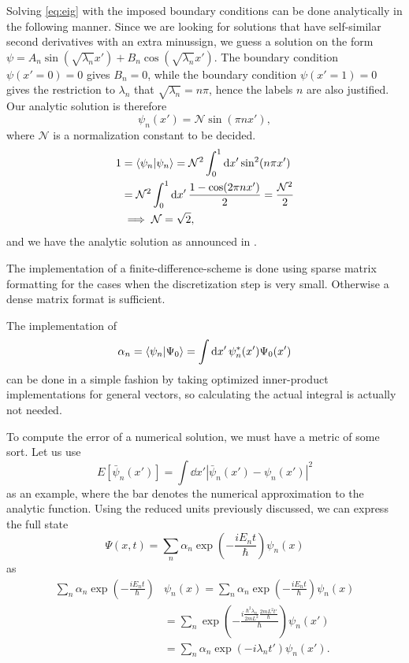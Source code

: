 Solving \cref{eq:eig} with the imposed boundary conditions can be done analytically in the following manner.
Since we are looking for solutions that have self-similar second derivatives with an extra minussign, we guess a solution on the form 
$\psi = A_n\sin(\sqrt{\lambda_n}x') + B_n\cos(\sqrt{\lambda_n}x')$. The boundary condition $\psi(x'=0) = 0$ gives $B_n = 0$, while the boundary condition $\psi(x'=1) = 0$ gives the restriction to $\lambda_n$ that $\sqrt{\lambda_n} = n\pi$, hence the labels $n$ are also justified. Our analytic solution is therefore 
\begin{equation}
\psi_n(x') = \mathcal{N}\sin(\pi n x'),
\end{equation} 
where $\mathcal{N}$ is a normalization constant to be decided.
\begin{align*} 
1 &= \braket{\psi_n}{\psi_n} = \mathcal{N}^2\int_{0}^{1}\dd{x'}\sin[2](n\pi x') \\
&=\mathcal{N}^2\int_0^1\dd{x'}\frac{1-\cos(2\pi n x')}{2}
= \frac{\mathcal{N}^2}{2} \\
&\implies \mathcal{N} = \sqrt{2},
\end{align*}
and we have the analytic solution as announced in \cite{assignment}.

The implementation of a finite-difference-scheme is done using sparse matrix formatting for the cases when the discretization step is very small. Otherwise a dense matrix format is sufficient.


The implementation of 
\begin{equation} 
\alpha_n = \braket{\psi_n}{\Psi_0} = \int\dd{x'}\psi_n^*(x')\Psi_0(x')
\end{equation}
can be done in a simple fashion by taking optimized inner-product implementations for general vectors, so calculating the actual integral is actually not needed. 


To compute the error of a numerical solution, we must have a metric of some sort. Let us use 
\begin{equation} 
E[\bar\psi_n(x')] = \int\dd{x'}|\bar \psi_n(x')-\psi_n(x')|^2
\end{equation}
as an example, where the bar denotes the numerical approximation to the analytic function.
Using the reduced units previously discussed, we can express the full state
\begin{equation} 
\Psi(x, t) = \sum_n\alpha_n\exp(-\frac{iE_n t}{\hbar})\psi_n(x)
\end{equation}
as
\begin{align*} 
\sum_n\alpha_n\exp(-\frac{iE_n t}{\hbar})&\psi_n(x) =\sum_n\alpha_n\exp(-\frac{iE_n t}{\hbar})\psi_n(x) \\ &=\sum_n\exp(-\frac{i\frac{\hbar^2\lambda_n}{2mL^2}\frac{2mL^2t'}{\hbar}}{\hbar})\psi_n(x') \\&= \sum_n\alpha_n\exp(-i\lambda_n t')\psi_n(x').
\end{align*}

